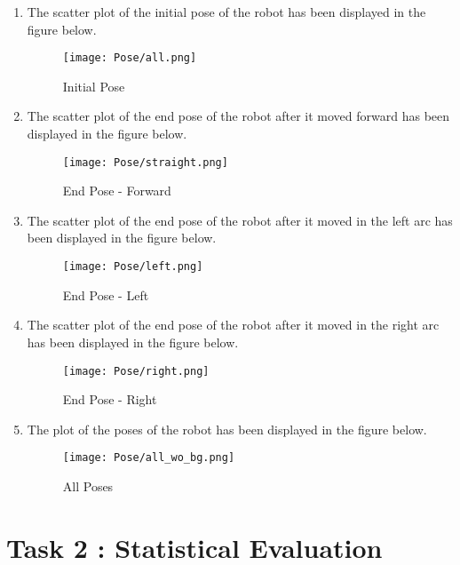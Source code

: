 \documentclass[10pt,a4paper]{article}
\begin{document}
\begin{enumerate}
	\item
	The scatter plot of the initial pose of the robot has been displayed in the figure below.

\begin{figure}[H]
	\centering
	\texttt{[image: Pose/all.png]}
	\caption{Initial Pose}
\end{figure}

\newpage
\item
The scatter plot of the end pose of the robot after it moved forward has been displayed in the figure below.

\begin{figure}[H]
	\centering
	\texttt{[image: Pose/straight.png]}
	\caption{End Pose - Forward}
\end{figure}



\newpage
\item
The scatter plot of the end pose of the robot after it moved in the left arc has been displayed in the figure below.

\begin{figure}[H]
	\centering
	\texttt{[image: Pose/left.png]}
	\caption{End Pose - Left}
\end{figure}


\newpage
\item
The scatter plot of the end pose of the robot after it moved in the right arc has been displayed in the figure below.

\begin{figure}[H]
	\centering
	\texttt{[image: Pose/right.png]}
	\caption{End Pose - Right}
\end{figure}



\newpage
\item
The plot of the poses of the robot has been displayed in the figure below.

\begin{figure}[H]
	\centering
	\texttt{[image: Pose/all\_wo\_bg.png]}
	\caption{All Poses}
\end{figure}

\end{enumerate}

\newpage
\section{Task 2 : Statistical Evaluation}
\end{document}
